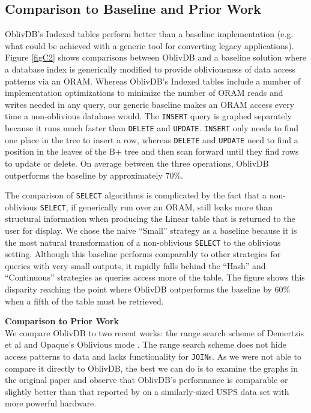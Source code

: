 \documentclass[conference]{IEEEtran}
\def\name/{OblivDB}
\begin{document}
\subsection{Comparison to Baseline and Prior Work}

\name/'s Indexed tables perform better than a baseline implementation (e.g. what could be achieved with a generic tool for converting legacy applications). Figure \ref{figC2} shows comparisons between \name/ and a baseline solution where a database index is generically modified to provide obliviousness of data access patterns via an ORAM. Whereas \name/'s Indexed tables include a number of implementation optimizations to minimize the number of ORAM reads and writes needed in any query, our generic baseline makes an ORAM access every time a non-oblivious database would. The \texttt{INSERT} query is graphed separately because it runs much faster than \texttt{DELETE} and \texttt{UPDATE}. \texttt{INSERT} only needs to find one place in the tree to insert a row, whereas \texttt{DELETE} and \texttt{UPDATE} need to find a position in the leaves of the B+ tree and then scan forward until they find rows to update or delete. On average between the three operations, \name/ outperforms the baseline by approximately 70\%. 

The comparison of \texttt{SELECT} algorithms is complicated by the fact that a non-oblivious \texttt{SELECT}, if generically run over an ORAM, still leaks more than structural information when producing the Linear table that is returned to the user for display. We chose the naive ``Small'' strategy as a baseline because it is the most natural transformation of a non-oblivious \texttt{SELECT} to the oblivious setting. Although this baseline performs comparably to other strategies for queries with very small outputs, it rapidly falls behind the ``Hash'' and ``Continuous'' strategies as queries access more of the table. The figure shows this disparity reaching the point where \name/ outperforms the baseline by 60\% when a fifth of the table must be retrieved. 

\medskip \noindent \textbf{Comparison to Prior Work}\\

We compare \name/ to two recent works: the range search scheme of Demertzis et al \cite{DPP+16} and Opaque's Oblivious mode \cite{ZDB+17}. The range search scheme does not hide access patterns to data and lacks functionality for \texttt{JOIN}s. As we were not able to compare it directly to \name/, the best we can do is to examine the graphs in the original paper and observe that \name/'s performance is comparable or slightly better than that reported by \cite{DPP+16} on a similarly-sized USPS data set with more powerful hardware. 
\end{document}
